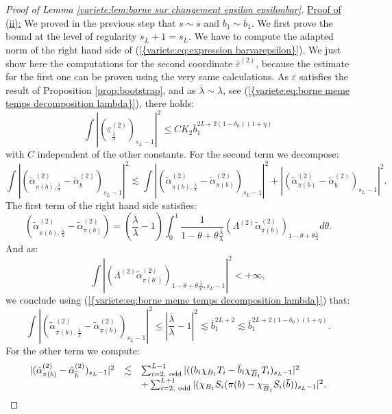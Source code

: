 \documentclass[11pt,a4paper,reqno]{amsart}
\theoremstyle{remark}
\numberwithin{equation}{section}
\begin{document}
\begin{proof}[Proof of Lemma \ref{variete:lem:borne sur changement epsilon epsilonbar}]
\underline{Proof of (ii):} We proved in the previous step that $s \sim {{\overline {s}}}$ and $b_1 \sim {{\overline {b}}}_1$. We first prove the bound at the level of regularity $s_{{{\overline {L}}}}+1=s_L$. We have to compute the adapted norm of the right hand side of {{\rm (\ref{{variete:eq:expression barvarepsilon}})}}. We just show here the computations for the second coordinate ${{\overline {\varepsilon}}}^{(2)}$, because the estimate for the first one can be proven using the very same calculations. As $\varepsilon$ satisfies the result of Proposition \ref{prop:bootstrap}, and as ${{\overline {\lambda}}}\sim \lambda$, see {{\rm (\ref{{variete:eq:borne meme temps decomposition lambda}})}}, there holds:
$$
\int |(\varepsilon^{(2)}_{\frac{{{\overline {\lambda}}}}{\lambda}})_{s_L-1}|^2\leq CK_2{{\overline {b}}}_1^{2L+2(1-\delta_0)(1+\eta)}
$$
with  $C$ independent of the other constants. For the second term we decompose:
$$
\int |(\tilde{\alpha}_{\pi (b),\frac{{{\overline {\lambda}}}}{\lambda}}^{(2)}-\tilde{\alpha}_{{{\overline {b}}}}^{(2)})_{s_L-1}|^2\lesssim \int |(\tilde{\alpha}_{\pi (b),\frac{{{\overline {\lambda}}}}{\lambda}}^{(2)}-\tilde{\alpha}_{\pi (b)}^{(2)})_{s_L-1}|^2+|(\tilde{\alpha}_{\pi (b)}^{(2)}-\tilde{\alpha}_{{{\overline {b}}}}^{(2)})_{s_L-1}|^2.
$$
The first term of the right hand side satisfies:
$$
(\tilde{\alpha}_{\pi (b),\frac{{{\overline {\lambda}}}}{\lambda}}^{(2)}-\tilde{\alpha}_{\pi (b)}^{(2)})=(\frac{{{\overline {\lambda}}}}{\lambda}-1)\int_0^1 \frac{1}{1-\theta+\theta\frac{{{\overline {\lambda}}}}{\lambda}}(\Lambda^{(2)}\tilde{\alpha}^{(2)}_{\pi (b)})_{1-\theta+\theta\frac{{{\overline {\lambda}}}}{\lambda}}d\theta.
$$
And as:
$$
\int |(\Lambda^{(2)}\tilde{\alpha}^{(2)}_{\pi (b')})_{1-\theta+\theta\frac{{{\overline {\lambda}}}}{\lambda'},s_L-1}|^2<+\infty,
$$
we conclude using {{\rm (\ref{{variete:eq:borne meme temps decomposition lambda}})}} that:
$$
\int |(\tilde{\alpha}_{\pi (b),\frac{{{\overline {\lambda}}}}{\lambda}}^{(2)}-\tilde{\alpha}_{\pi (b)}^{(2)})_{s_L-1}|^2\leq |\frac{{{\overline {\lambda}}}}{\lambda}-1|^2\lesssim {{\overline {b}}}_1^{2L+2}\lesssim {{\overline {b}}}_1^{2L+2(1-\delta_0)(1+\eta)}.
$$
For the other term we compute:
$$
\begin{array}{r c l}
 |(\tilde{\alpha}_{\pi (b)}^{(2)}-\tilde{\alpha}_{{{\overline {b}}}}^{(2)})_{s_L-1}|^2 &\lesssim&  \sum_{i=2, \ \text{odd}}^{L-1} |((b_i\chi_{B_1}T_i-{{\overline {b}}}_i\chi_{{{\overline {B}}}_1}T_i)_{s_L-1}|^2\\
 &&+\sum_{i=2, \ \text{odd}}^{L+1}|(\chi_{B_1}S_i(\pi(b)-\chi_{{{\overline {B}}}_1}S_i({{\overline {b}}}))_{s_L-1}|^2.

\end{array}$$
\end{proof}
\end{document}
